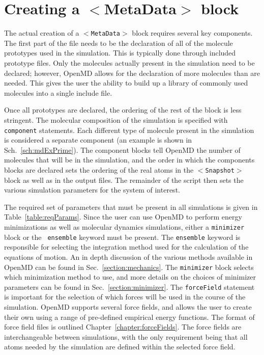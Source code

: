 \documentclass[]{book}
\begin{document}
\section{\label{sec:miscConcepts}Creating a $<$MetaData$>$ block}

The actual creation of a {\tt $<$MetaData$>$} block requires several key
components. The first part of the file needs to be the declaration of
all of the molecule prototypes used in the simulation. This is
typically done through included prototype files. Only the molecules
actually present in the simulation need to be declared; however, {\sc
OpenMD} allows for the declaration of more molecules than are
needed. This gives the user the ability to build up a library of
commonly used molecules into a single include file.

Once all prototypes are declared, the ordering of the rest of the
block is less stringent.  The molecular composition of the simulation
is specified with {\tt component} statements. Each different type of
molecule present in the simulation is considered a separate
component (an example is shown in
Sch.~\ref{sch:mdExPrime}).  The component blocks tell {\sc OpenMD} the
number of molecules that will be in the simulation, and the order in
which the components blocks are declared sets the ordering of the real
atoms in the {\tt $<$Snapshot$>$} block as well as in the output files. The
remainder of the script then sets the various simulation parameters
for the system of interest.

The required set of parameters that must be present in all simulations
is given in Table~\ref{table:reqParams}.  Since the user can use {\sc
  OpenMD} to perform energy minimizations as well as molecular
dynamics simulations, either a {\tt minimizer} block or the {\tt
  ensemble} keyword must be present.  The {\tt ensemble} keyword is
responsible for selecting the integration method used for the
calculation of the equations of motion. An in depth discussion of the
various methods available in {\sc OpenMD} can be found in
Sec.~\ref{section:mechanics}.  The {\tt minimizer} block selects which
minimization method to use, and more details on the choices of
minimizer parameters can be found in Sec.~\ref{section:minimizer}. The
{\tt forceField} statement is important for the selection of which
forces will be used in the course of the simulation. {\sc OpenMD}
supports several force fields, and allows the user to create their own
using a range of pre-defined empirical energy functions.  The format
of force field files is outlined
Chapter~\ref{chapter:forceFields}. The force fields are
interchangeable between simulations, with the only requirement being
that all atoms needed by the simulation are defined within the
selected force field.
\end{document}
